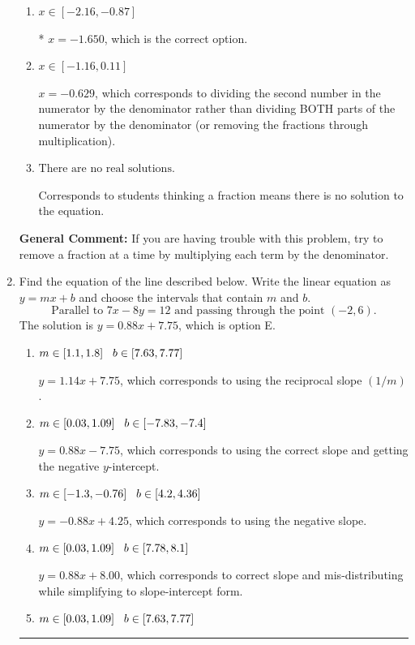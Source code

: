 \documentclass{extbook}[14pt]
\newcommand{\litem}[1]{\item #1

\rule{\textwidth}{0.4pt}}
\begin{document}
\begin{enumerate}
{\begin{enumerate}[label=\Alph*.]
 $x = -4.200$, which corresponds to dividing the coefficients in front of x by the denominator rather than dividing BOTH parts of the numerator by the denominator (or removing the fractions through multiplication).
\item \( x \in [-2.16, -0.87] \)

* $x = -1.650$, which is the correct option.
\item \( x \in [-1.16, 0.11] \)

 $x = -0.629$, which corresponds to dividing the second number in the numerator by the denominator rather than dividing BOTH parts of the numerator by the denominator (or removing the fractions through multiplication).
\item \( \text{There are no real solutions.} \)

Corresponds to students thinking a fraction means there is no solution to the equation.
\end{enumerate}

\textbf{General Comment:} If you are having trouble with this problem, try to remove a fraction at a time by multiplying each term by the denominator.
}
\litem{
Find the equation of the line described below. Write the linear equation as $ y=mx+b $ and choose the intervals that contain $m$ and $b$.
\[ \text{Parallel to } 7 x - 8 y = 12 \text{ and passing through the point } (-2, 6). \]
The solution is \( y = 0.88x + 7.75 \), which is option E.\begin{enumerate}[label=\Alph*.]
\item \( m \in [1.1, 1.8] \hspace*{3mm} b \in [7.63, 7.77] \)

 $y = 1.14x + 7.75$, which corresponds to using the reciprocal slope $(1/m)$.
\item \( m \in [0.03, 1.09] \hspace*{3mm} b \in [-7.83, -7.4] \)

 $y = 0.88x - 7.75$, which corresponds to using the correct slope and getting the negative $y$-intercept.
\item \( m \in [-1.3, -0.76] \hspace*{3mm} b \in [4.2, 4.36] \)

 $y = -0.88x + 4.25$, which corresponds to using the negative slope.
\item \( m \in [0.03, 1.09] \hspace*{3mm} b \in [7.78, 8.1] \)

 $y = 0.88x + 8.00$, which corresponds to correct slope and mis-distributing while simplifying to slope-intercept form.
\item \( m \in [0.03, 1.09] \hspace*{3mm} b \in [7.63, 7.77] \)


\end{enumerate}}
\end{enumerate}
\end{document}
